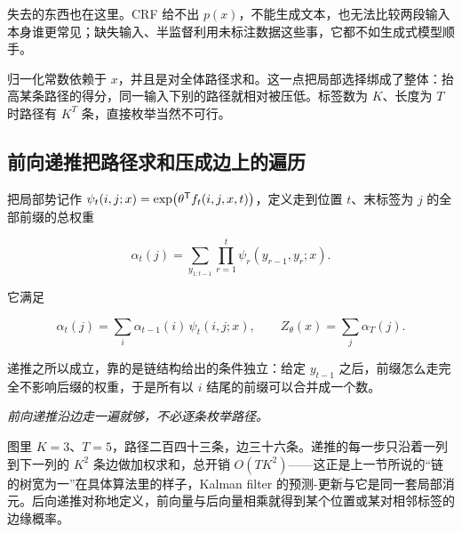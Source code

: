 失去的东西也在这里。CRF 给不出 \(p(x)\)，不能生成文本，也无法比较两段输入本身谁更常见；缺失输入、半监督利用未标注数据这些事，它都不如生成式模型顺手。

归一化常数依赖于 \(x\)，并且是对全体路径求和。这一点把局部选择绑成了整体：抬高某条路径的得分，同一输入下别的路径就相对被压低。标签数为 \(K\)、长度为 \(T\) 时路径有 \(K^{T}\) 条，直接枚举当然不可行。

\subsection{前向递推把路径求和压成边上的遍历}

把局部势记作 \(\psi_t(i,j;x)=\exp\bigl(\theta^{\mathsf{T}}f_t(i,j,x,t)\bigr)\)，定义走到位置 \(t\)、末标签为 \(j\) 的全部前缀的总权重

\[
\alpha_t(j)=\sum_{y_{1:t-1}}\prod_{r=1}^{t}\psi_r(y_{r-1},y_r;x).
\]

它满足

\[
\alpha_t(j)=\sum_{i}\alpha_{t-1}(i)\,\psi_t(i,j;x),
\qquad
Z_\theta(x)=\sum_j\alpha_T(j).
\]

递推之所以成立，靠的是链结构给出的条件独立：给定 \(y_{t-1}\) 之后，前缀怎么走完全不影响后缀的权重，于是所有以 \(i\) 结尾的前缀可以合并成一个数。

\begin{center}
\end{center}

\emph{前向递推沿边走一遍就够，不必逐条枚举路径。}

图里 \(K=3\)、\(T=5\)，路径二百四十三条，边三十六条。递推的每一步只沿着一列到下一列的 \(K^2\) 条边做加权求和，总开销 \(O(TK^2)\)——这正是上一节所说的``链的树宽为一''在具体算法里的样子，Kalman filter 的预测-更新与它是同一套局部消元。后向递推对称地定义，前向量与后向量相乘就得到某个位置或某对相邻标签的边缘概率。

